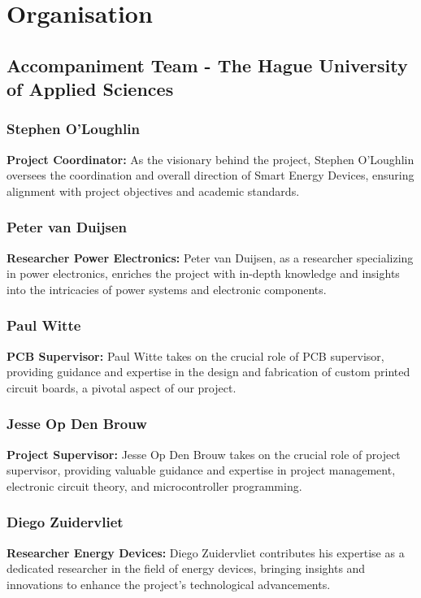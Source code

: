 \section{Organisation}
\subsection{Accompaniment Team - The Hague University of Applied Sciences}
\subsubsection*{Stephen O’Loughlin}
\textbf{Project Coordinator:} As the visionary behind the project, Stephen O’Loughlin oversees the coordination and overall direction of Smart Energy Devices, ensuring alignment with project objectives and academic standards.

\subsubsection*{Peter van Duijsen}
\textbf{Researcher Power Electronics:} Peter van Duijsen, as a researcher specializing in power electronics, enriches the project with in-depth knowledge and insights into the intricacies of power systems and electronic components.

\subsubsection*{Paul Witte}
\textbf{PCB Supervisor:} Paul Witte takes on the crucial role of PCB supervisor, providing guidance and expertise in the design and fabrication of custom printed circuit boards, a pivotal aspect of our project.

\subsubsection*{Jesse Op Den Brouw}
\textbf{Project Supervisor:} Jesse Op Den Brouw takes on the crucial role of project supervisor, providing valuable guidance and expertise in project management, electronic circuit theory, and microcontroller programming.

\subsubsection*{Diego Zuidervliet}
\textbf{Researcher Energy Devices:} Diego Zuidervliet contributes his expertise as a dedicated researcher in the field of energy devices, bringing insights and innovations to enhance the project's technological advancements.

